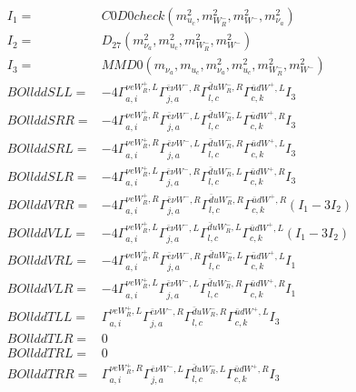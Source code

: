\documentclass[A4,landscape]{article}
\begin{document}
\begin{align} 
I_1 = & C0D0check(m^2_{u_{{c}}}, m^2_{W_R^-}, m^2_{W^-}, m^2_{\nu_{{a}}}) \\ 
I_2 = & D_{27}(m^2_{\nu_{{a}}}, m^2_{u_{{c}}}, m^2_{W_R^-}, m^2_{W^-}) \\ 
I_3 = & MMD0(m_{\nu_{{a}}}, m_{u_{{c}}}, m^2_{\nu_{{a}}}, m^2_{u_{{c}}}, m^2_{W_R^-}, m^2_{W^-}) \\ 
  BOllddSLL= & -4  \Gamma^{\nu e W_R^+,L}_{a, i} \Gamma^{\bar{e}\nu W^- ,R}_{j, a} \Gamma^{\bar{d}u W_R^- ,R}_{l, c} \Gamma^{\bar{u}d W^+,L}_{c, k} I_3 \\ 
  BOllddSRR= & -4  \Gamma^{\nu e W_R^+,R}_{a, i} \Gamma^{\bar{e}\nu W^- ,L}_{j, a} \Gamma^{\bar{d}u W_R^- ,L}_{l, c} \Gamma^{\bar{u}d W^+,R}_{c, k} I_3 \\ 
  BOllddSRL= & -4  \Gamma^{\nu e W_R^+,R}_{a, i} \Gamma^{\bar{e}\nu W^- ,L}_{j, a} \Gamma^{\bar{d}u W_R^- ,R}_{l, c} \Gamma^{\bar{u}d W^+,L}_{c, k} I_3 \\ 
  BOllddSLR= & -4  \Gamma^{\nu e W_R^+,L}_{a, i} \Gamma^{\bar{e}\nu W^- ,R}_{j, a} \Gamma^{\bar{d}u W_R^- ,L}_{l, c} \Gamma^{\bar{u}d W^+,R}_{c, k} I_3 \\ 
  BOllddVRR= & -4  \Gamma^{\nu e W_R^+,R}_{a, i} \Gamma^{\bar{e}\nu W^- ,R}_{j, a} \Gamma^{\bar{d}u W_R^- ,R}_{l, c} \Gamma^{\bar{u}d W^+,R}_{c, k} (I_1 - 3 I_2) \\ 
  BOllddVLL= & -4  \Gamma^{\nu e W_R^+,L}_{a, i} \Gamma^{\bar{e}\nu W^- ,L}_{j, a} \Gamma^{\bar{d}u W_R^- ,L}_{l, c} \Gamma^{\bar{u}d W^+,L}_{c, k} (I_1 - 3 I_2) \\ 
  BOllddVRL= & -4  \Gamma^{\nu e W_R^+,R}_{a, i} \Gamma^{\bar{e}\nu W^- ,R}_{j, a} \Gamma^{\bar{d}u W_R^- ,L}_{l, c} \Gamma^{\bar{u}d W^+,L}_{c, k} I_1 \\ 
  BOllddVLR= & -4  \Gamma^{\nu e W_R^+,L}_{a, i} \Gamma^{\bar{e}\nu W^- ,L}_{j, a} \Gamma^{\bar{d}u W_R^- ,R}_{l, c} \Gamma^{\bar{u}d W^+,R}_{c, k} I_1 \\ 
  BOllddTLL= &  \Gamma^{\nu e W_R^+,L}_{a, i} \Gamma^{\bar{e}\nu W^- ,R}_{j, a} \Gamma^{\bar{d}u W_R^- ,R}_{l, c} \Gamma^{\bar{u}d W^+,L}_{c, k} I_3 \\ 
  BOllddTLR= & 0 \\ 
  BOllddTRL= & 0 \\ 
  BOllddTRR= &  \Gamma^{\nu e W_R^+,R}_{a, i} \Gamma^{\bar{e}\nu W^- ,L}_{j, a} \Gamma^{\bar{d}u W_R^- ,L}_{l, c} \Gamma^{\bar{u}d W^+,R}_{c, k} I_3 \\ 
\end{align} 
\end{document}
